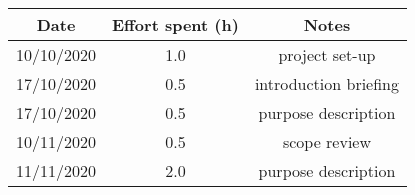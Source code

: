 \documentclass[../../main.tex]{subfiles}
\begin{document}
    \begin{center}
        \begin{tabular}{|c| |c| |c|} 
            \hline
            Date & Effort spent (h) & Notes\\ [0.5ex] 
            \hline\hline
            10/10/2020 & 1.0 & project set-up\\ 
            17/10/2020 & 0.5 & introduction briefing\\ 
            17/10/2020 & 0.5 & purpose description\\ 
            10/11/2020 & 0.5 & scope review\\
            11/11/2020 & 2.0 & purpose description\\
            \hline
        \end{tabular}
    \end{center}
\end{document}
